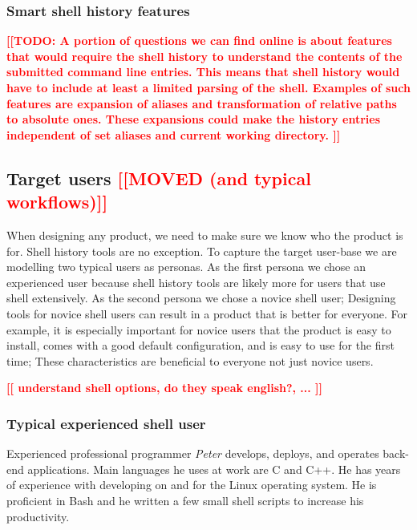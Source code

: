 \documentclass[thesis=M,english]{FITthesis}[2012/10/20]
\newcommand{\todotext}[1]{\textcolor{red}{\textbf{[[#1]]}}}
\newcommand{\redtext}[1]{\textcolor{red}{[[#1]]}}
\begin{document}
\subsubsection*{Smart shell history features}

\todotext{TODO: A portion of questions we can find online is about features that would require the shell history to understand the contents of the submitted command line entries. This means that shell history would have to include at least a limited parsing of the shell. Examples of such features are expansion of aliases and transformation of relative paths to absolute ones. These expansions could make the history entries independent of set aliases and current working directory. }


\subsection{Target users \redtext{MOVED (and typical workflows)} }

When designing any product, we need to make sure we know who the product is for. Shell history tools are no exception. To capture the target user-base we are modelling two typical users as personas. As the first persona we chose an experienced user because shell history tools are likely more for users that use shell extensively. As the second persona we chose a novice shell user; Designing tools for novice shell users can result in a product that is better for everyone. For example, it is especially important for novice users that the product is easy to install, comes with a good default configuration, and is easy to use for the first time; These characteristics are beneficial to everyone not just novice users. 

\todotext{ understand shell options, do they speak english?, ... }


\subsubsection*{Typical experienced shell user}

Experienced professional programmer \textit{Peter} develops, deploys, and operates back-end applications. Main languages he uses at work are C and C++. He has years of experience with developing on and for the Linux operating system. He is proficient in Bash and he written a few small shell scripts to increase his productivity.
\end{document}
